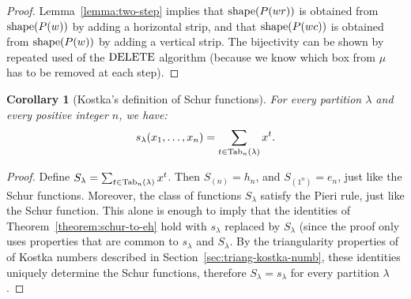 \documentclass[11pt]{amsart}
\newtheorem{corollary}[theorem]{Corollary}
\theoremstyle{definition}
\theoremstyle{example}
\newcommand{\del}{\textup{DELETE}}
\newcommand{\shape}{\textup{shape}}
\newcommand{\Tab}{\textup{Tab}}
\begin{document}
\begin{proof}
  Lemma~\ref{lemma:two-step} implies that $\shape(P(wr))$ is obtained from $\shape(P(w))$ by adding a horizontal strip, and that $\shape(P(wc))$ is obtained from \linebreak $\shape(P(w))$ by adding a vertical strip.
  The bijectivity can be shown by repeated used of the $\del$ algorithm (because we know which box from $\mu$ has to be removed at each step).
\end{proof}
\begin{corollary}
  [Kostka's definition of Schur functions]
  \label{corollary:kostka-def-schur}
  For every partition $\lambda$ and every positive integer $n$, we have:
  \begin{displaymath}
    s_\lambda(x_1,\dotsc,x_n) = \sum_{t\in\Tab_n(\lambda)} x^t.
  \end{displaymath}
\end{corollary}
\begin{proof}
  Define $S_\lambda = \sum_{t\in \Tab_n(\lambda)} x^t$.
  Then $S_{(n)} = h_n$, and $S_{(1^n)} = e_n$, just like the Schur functions.
  Moreover, the class of functions $S_\lambda$ satisfy the Pieri rule, just like the Schur function.
  This alone is enough to imply that the identities of Theorem~\ref{theorem:schur-to-eh} hold with $s_\lambda$ replaced by $S_\lambda$ (since the proof only uses properties that are common to $s_\lambda$ and $S_\lambda$.
  By the triangularity properties of of Kostka numbers described in Section~\ref{sec:triang-kostka-numb}, these identities uniquely determine the Schur functions, therefore $S_\lambda=s_\lambda$ for every partition $\lambda$.
\end{proof}
\end{document}
